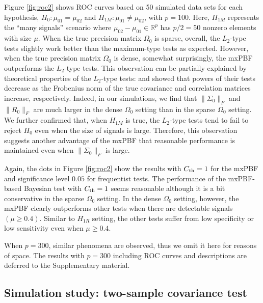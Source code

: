 \documentclass[11pt]{article}
\newcommand{\sg}{\Sigma}
\newcommand{\bbR}{\mathbb{R}}
\begin{document}
Figure \ref{fig:roc2} shows ROC curves based on 50 simulated data sets for each hypothesis, $H_0: \mu_{01}=\mu_{02}$ and $H_{1M}: \mu_{01}\neq \mu_{02}$, with $p=100$.
Here, $H_{1M}$ represents the ``many signals'' scenario where $\mu_{02}  -\mu_{01} \in \bbR^p$ has $p/2 = 50$ nonzero elements with size $\mu$.
When the true precision matrix $\Omega_0$ is sparse, overall, the $L_2$-type tests slightly work better than the maximum-type tests as expected.
However, when the true precision matrix $\Omega_0$ is dense, somewhat surprisingly, the mxPBF outperforms the $L_2$-type tests.
This observation can be partially explained by theoretical properties of the $L_2$-type tests: \cite{bai1996effect} and \cite{srivastava2008test} showed that powers of their tests decrease as the Frobenius norm of the true covariance and correlation matrices increase, respectively.
Indeed, in our simulations, we find that $\|\sg_0\|_F$ and $\|R_0\|_F$ are much larger in the dense $\Omega_0$ setting than in the sparse $\Omega_0$ setting.
We further confirmed that, when $H_{1M}$ is true, the $L_2$-type tests tend to fail to reject $H_0$ even when the size of signals is large.
Therefore, this observation suggests another advantage of the mxPBF that reasonable performance is maintained even when $\|\sg_0\|_F$ is large.


Again, the dots in Figure \ref{fig:roc2} show the results with $C_{\rm th}=1$ for the mxPBF and significance level $0.05$ for frequentist tests.
The performance of the mxPBF-based Bayesian test with $C_{\rm th}=1$ seems reasonable although it is a bit conservative in the sparse $\Omega_0$ setting.
In the dense $\Omega_0$ setting, however, the mxPBF clearly outperforms other tests when there are detectable signals $(\mu \ge 0.4)$.
Similar to $H_{1R}$ setting, the other tests suffer from low specificity or low sensitivity even when $\mu \ge 0.4$.


When $p=300$, similar phenomena are observed, thus we omit it here for reasons of space.
The results with $p=300$ including ROC curves and descriptions are deferred to the Supplementary material.

\subsection{Simulation study: two-sample covariance test}\label{subsec:sim_cov}
\end{document}
